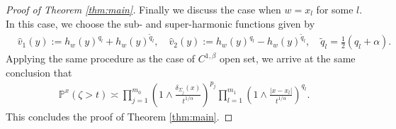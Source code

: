 \documentclass[12pt,a4paper]{amsart}
\numberwithin{equation}{section}
\theoremstyle{plain}
\newcommand{\Si}{\Sigma}
\newcommand{\mb}{\mathbb}
\newcommand{\wt}{\widetilde}
\newcommand{\1}{\mathbbm{1}}
\begin{document}
\begin{proof}[Proof of Theorem \ref{thm:main}]
Finally we discuss the case when $w = x_l$ for some $l$. In this case, we choose the sub- and super-harmonic functions given by 
\begin{equation}
\begin{aligned}
& \hat{v}_1(y) := h_w(y)^{q_l}+ h_w(y)^{\wt q_l},\quad \hat{v}_2(y):= h_w(y)^{q_l} - h_w(y)^{\wt q_l},\quad \wt q_l =\frac12(q_l+\alpha).
\end{aligned}
\end{equation}
Applying the same procedure as the case of $C^{1,\beta}$ open set, we arrive at the same conclusion that 
\begin{align*}
\mb P^x(\zeta >t) 
\asymp \prod_{j=1}^{m_0} (1\wedge \frac{\delta_{\Si_j}(x)}{t^{1/\alpha}})^{p_j} \prod_{l=1}^{m_1} (1\wedge \frac{|x-x_l|}{t^{1/\alpha}})^{q_l}.
\end{align*}
This concludes the proof of Theorem \ref{thm:main}.   
\end{proof}



\appendix
\end{document}
